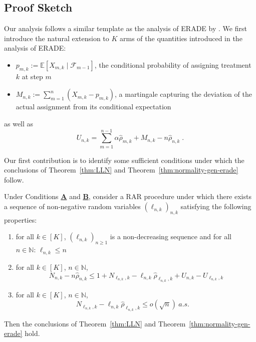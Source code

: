 \subsection{Proof Sketch}\label{sec:rts-proof}
Our analysis follows a similar template as the analysis of ERADE by \cite{hu2009efficient}. We first introduce the natural extension to $K$ arms of the quantities introduced in the analysis of ERADE:
	\begin{itemize}
		\item $p_{m,k} := \mathbb{E}[X_{m,k} \mid \mathcal{F}_{m-1}]$, the conditional probability of assigning treatment $k$ at step $m$
		\item $M_{n,k} := \sum_{m=1}^{n}(X_{m,k} - p_{m,k})$, a martingale capturing the deviation of the actual assignment from its conditional expectation
	\end{itemize}
as well as
\[U_{n,k} = \sum_{m=1}^{n-1} \alpha \hat{\rho}_{m,k} + M_{n,k} - n \hat{\rho}_{n,k}\;.\]

Our first contribution is to identify some sufficient conditions under which the conclusions of Theorem~\ref{thm:LLN} and Theorem~\ref{thm:normality-gen-erade} follow.

\begin{lemma} \label{lem:generic-conditions-main} Under Conditions \hyperlink{CA}{\textbf{A}} and \hyperlink{CB}{\textbf{B}}, consider a RAR procedure under which there exists a sequence of non-negative random variables $(\ell_{n,k})_{n,k}$ satisfying the following properties:
\begin{enumerate}[label=(\roman*)]
		\item for all $k\in [K]$, \(\left(\ell_{n,k}\right)_{n \geq 1}\) is a non-decreasing sequence and for all \(n \in \mathbb{N}: \,\ell_{n,k} \leq n\)
		\item for all $k\in [K]$, $n \in \mathbb{N}$,
		\begin{equation}\label{eq:prelim-sketch}
			N_{n,k} - n\hat{\rho}_{n,k} \leq 1+N_{\ell_{n,k},k} - \ell_{n,k} \hat{\rho}_{\ell_{n,k},k} + U_{n,k} - U_{\ell_{n,k},k}
		\end{equation}
		\item for all $k\in [K]$, $n \in \mathbb{N}$,
		\begin{equation}\label{eq:condition-sketch}
			N_{\ell_{n,k},k} - \ell_{n,k} \hat{\rho}_{\ell_{n,k},k} \leq o(\sqrt{n}) \ a.s.
			\quad
		\end{equation}
	\end{enumerate}
Then the conclusions of Theorem~\ref{thm:LLN} and Theorem~\ref{thm:normality-gen-erade} hold.
\end{lemma}

